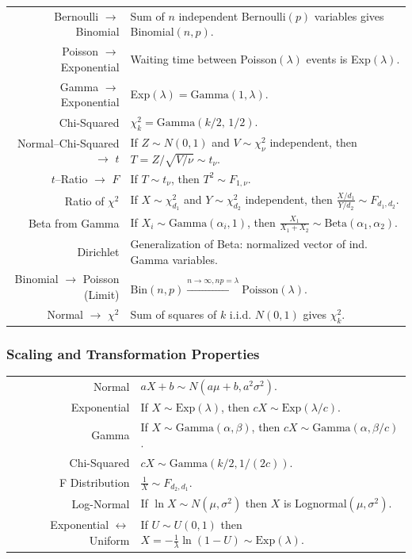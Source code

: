 \documentclass[11pt,a4paper]{article}
\theoremstyle{definition}
\begin{document}
\begin{longtable}{r l}
Bernoulli $\to$ Binomial & Sum of $n$ independent Bernoulli$(p)$ variables gives Binomial$(n,p)$.\\
Poisson $\to$ Exponential & Waiting time between Poisson$(\lambda)$ events is Exp$(\lambda)$.\\
Gamma $\to$ Exponential & Exp$(\lambda) = \text{Gamma}(1,\lambda)$.\\
Chi-Squared & $\chi^2_k = \text{Gamma}(k/2,\,1/2)$.\\
Normal–Chi-Squared $\to$ $t$ & If $Z\sim N(0,1)$ and $V\sim \chi^2_\nu$ independent, then $T = Z / \sqrt{V/\nu} \sim t_\nu$.\\
$t$–Ratio $\to$ $F$ & If $T\sim t_\nu$, then $T^2 \sim F_{1,\nu}$.\\
Ratio of $\chi^2$ & If $X\sim \chi^2_{d_1}$ and $Y\sim \chi^2_{d_2}$ independent, then $\frac{X/d_1}{Y/d_2} \sim F_{d_1,d_2}$.\\
Beta from Gamma & If $X_i\sim \text{Gamma}(\alpha_i,1)$, then $\frac{X_1}{X_1+X_2}\sim \text{Beta}(\alpha_1,\alpha_2)$.\\
Dirichlet & Generalization of Beta: normalized vector of ind. Gamma variables.\\
Binomial $\to$ Poisson (Limit) & $\text{Bin}(n,p)\xrightarrow{n\to\infty, np=\lambda}\text{Poisson}(\lambda)$.\\
Normal $\to$ $\chi^2$ & Sum of squares of $k$ i.i.d. $N(0,1)$ gives $\chi^2_k$.\\
\end{longtable}

\subsubsection*{Scaling and Transformation Properties}
\begin{longtable}{r l}
Normal & $aX+b \sim N(a\mu+b, a^2\sigma^2)$.\\
Exponential & If $X\sim \text{Exp}(\lambda)$, then $cX \sim \text{Exp}(\lambda/c)$.\\
Gamma & If $X\sim \text{Gamma}(\alpha,\beta)$, then $cX \sim \text{Gamma}(\alpha,\beta/c)$.\\
Chi-Squared & $cX \sim \text{Gamma}(k/2, 1/(2c))$.\\
F Distribution & $\frac{1}{X}\sim F_{d_2,d_1}$.\\
Log-Normal & If $\ln X\sim N(\mu,\sigma^2)$ then $X$ is Lognormal$(\mu,\sigma^2)$.\\
Exponential $\leftrightarrow$ Uniform & If $U\sim U(0,1)$ then $X=-\frac{1}{\lambda}\ln(1-U)\sim \text{Exp}(\lambda)$.\\
\end{longtable}
\end{document}
